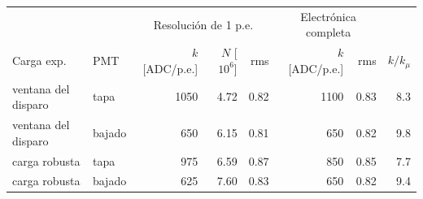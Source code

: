 \begin{tabular}{llrrrrrr}
\toprule
 & & \multicolumn{3}{c}{Resolución de 1 p.e.} & \multicolumn{2}{c}{Electrónica completa} & \\
Carga exp. & PMT & $k$ [ADC/p.e.] & $N$ [$10^6$] & rms & $k$ [ADC/p.e.] & rms & $k/k_\mu$ \\
\midrule
ventana del disparo & tapa & 1050 & 4.72 & 0.82 & 1100 & 0.83 & 8.3 \\
ventana del disparo & bajado & 650 & 6.15 & 0.81 & 650 & 0.82 & 9.8 \\
carga robusta & tapa & 975 & 6.59 & 0.87 & 850 & 0.85 & 7.7 \\
carga robusta & bajado & 625 & 7.60 & 0.83 & 650 & 0.82 & 9.4 \\
\bottomrule
\end{tabular}
